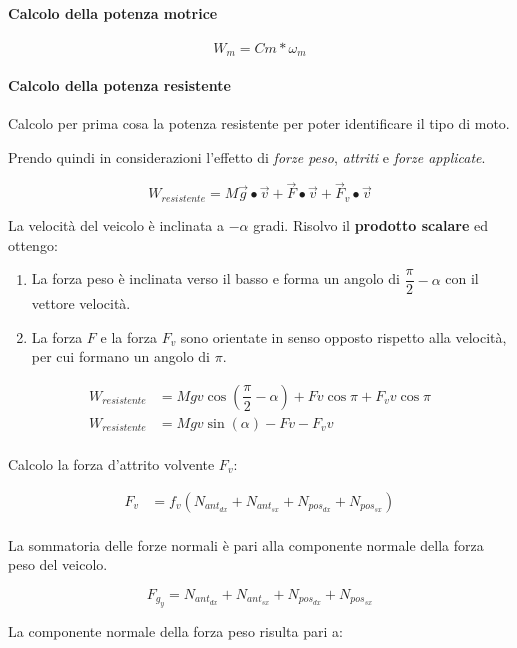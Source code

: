 \documentclass[main.tex]{subfiles}
\begin{document}
\paragraph{Calcolo della potenza motrice}

\[
	W_m = Cm*\omega_m
\]

\paragraph{Calcolo della potenza resistente} Calcolo per prima cosa la potenza resistente per poter identificare il tipo di moto.

Prendo quindi in considerazioni l'effetto di \textit{forze peso}, \textit{attriti} e \textit{forze applicate}.

\[
	W_{resistente} = M\vec{g}\bullet \vec{v} + \vec{F}\bullet \vec{v} + \vec{F}_v\bullet \vec{v}
\]

La velocità del veicolo è inclinata a $-\alpha$ gradi.
Risolvo il \textbf{prodotto scalare} ed ottengo:

\begin{enumerate}
	\item La forza peso è inclinata verso il basso e forma un angolo di $\dfrac{\pi}{2} - \alpha$ con il vettore velocità.
	\item La forza $F$ e la forza $F_v$ sono orientate in senso opposto rispetto alla velocità, per cui formano un angolo di $\pi$.
\end{enumerate}

\begin{align*}
	W_{resistente} &= Mgv\cos(\dfrac{\pi}{2} - \alpha) + Fv\cos\pi + F_vv\cos\pi \\
	W_{resistente} &= Mgv\sin(\alpha) - Fv - F_vv \\
\end{align*}

Calcolo la forza d'attrito volvente $F_v$:

\begin{align*}
	F_v &=  f_v(N_{ant_{dx}} + N_{ant_{sx}} + N_{pos_{dx}} + N_{pos_{sx}}) \\
\end{align*}

La sommatoria delle forze normali è pari alla componente normale della forza peso del veicolo.

\[
	F_{g_y} = N_{ant_{dx}} + N_{ant_{sx}} + N_{pos_{dx}} + N_{pos_{sx}}
\]

La componente normale della forza peso risulta pari a:
\end{document}
